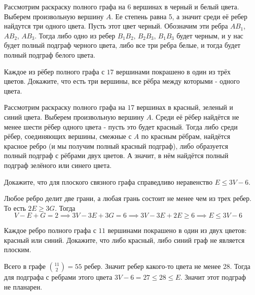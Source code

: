 \documentclass[11pt, a4paper]{common/document_template}
\begin{document}
\begin{Solution}
Рассмотрим раскраску полного графа на $6$ вершинах в черный и белый цвета. Выберем произвольную вершину $A$. Ее степень равна 5, а значит среди её ребер найдутся три одного цвета. Пусть этот цвет черный. Обозначим эти ребра $AB_{1}$, $AB_{2}$, $AB_{3}$. Тогда либо одно из ребер $B_{1}B_{2}$, $B_{2}B_{3}$, $B_{1}B_{3}$ будет черным, и у нас будет полный подграф черного цвета, либо все три ребра белые, и тогда будет полный подграф белого цвета.
\end{Solution}

\begin{exercise}
Каждое из рёбер полного графа с $17$ вершинами покрашено в один из трёх цветов. Докажите, что есть три вершины, все рёбра между которыми - одного цвета.
\end{exercise}

\begin{Solution}
Рассмотрим раскраску полного графа на $17$ вершинах в красный, зеленый и синий цвета. Выберем произвольную вершину $A$. Среди её рёбер найдётся не менее шести рёбер одного цвета - пусть это будет красный. Тогда либо среди рёбер, соединяющих вершины, смежные с $A$ по красным рёбрам, найдётся красное ребро (и мы получим полный красный подграф), либо образуется полный подграф с рёбрами двух цветов. А значит, в нём найдётся полный подграф зелёного или синего цвета.
\end{Solution}

\begin{exercise}
Докажите, что для плоского связного графа справедливо неравенство  $E \leqslant  3V - 6$.
\end{exercise}

\begin{Solution}
Любое ребро делит две грани, а любая грань состоит не менее чем из трех ребер. То есть $2E \geqslant 3G$. Тогда 
$$
V - E + G = 2 \implies 3V - 3E + 3G = 6 \implies 3V - 3E + 2E \geqslant 6 \implies E \leqslant 3V - 6
$$  
\end{Solution}

\begin{exercise}
Каждое ребро полного графа с $11$ вершинами покрашено в один из двух цветов: красный или синий. Докажите, что либо красный, либо синий граф не является плоским.
\end{exercise}

\begin{Solution}
Всего в графе $\binom{11}{2} = 55$ ребер. Значит ребер какого-то цвета не менее 28. Тогда для подграфа с ребрами этого цвета $3V - 6 = 27 \leqslant 28 \leqslant E$. Значит этот подграф не планарен.
\end{Solution}
\end{document}

